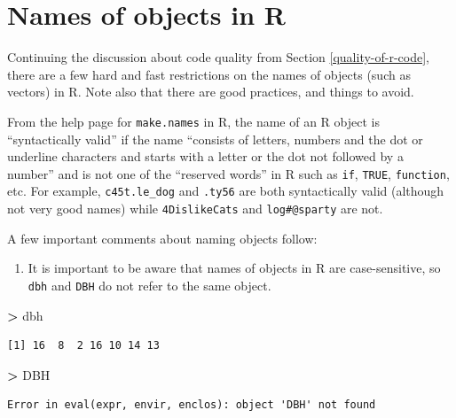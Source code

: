 \documentclass[]{krantz}
\makeatletter
\newenvironment{Shaded}{\begin{snugshade}}{\end{snugshade}}
\newcommand{\NormalTok}[1]{#1}
\newcommand{\OperatorTok}[1]{\textcolor[rgb]{0.43,0.43,0.43}{\textbf{#1}}}
\newcommand{\StringTok}[1]{\textcolor[rgb]{0.5,0.5,0.5}{#1}}
\providecommand{\tightlist}{%
  \setlength{\itemsep}{0pt}\setlength{\parskip}{0pt}}
\newenvironment{kframe}{%
\medskip{}
\setlength{\fboxsep}{.8em}
 \def\at@end@of@kframe{}%
 \ifinner\ifhmode%
  \def\at@end@of@kframe{\end{minipage}}%
  \begin{minipage}{\columnwidth}%
 \fi\fi%
 \def\FrameCommand##1{\hskip\@totalleftmargin \hskip-\fboxsep
 \colorbox{shadecolor}{##1}\hskip-\fboxsep
     \hskip-\linewidth \hskip-\@totalleftmargin \hskip\columnwidth}%
 \MakeFramed {\advance\hsize-\width
   \@totalleftmargin\z@ \linewidth\hsize
   \@setminipage}}%
 {\par\unskip\endMakeFramed%
 \at@end@of@kframe}
\renewenvironment{Shaded}{\begin{kframe}}{\end{kframe}}
\makeatother
\begin{document}
\hypertarget{names-of-objects-in-r}{%
\section{Names of objects in R}\label{names-of-objects-in-r}}

Continuing the discussion about code quality from Section \ref{quality-of-r-code}, there are a few hard and fast restrictions on the names of objects (such as vectors) in R. Note also that there are good practices, and things to avoid.

From the help page for \texttt{make.names} in R, the name of an R object is ``syntactically valid'' if the name ``consists of letters, numbers and the dot or underline characters and starts with a letter or the dot not followed by a number'' and is not one of the ``reserved words'' in R such as \texttt{if}, \texttt{TRUE}, \texttt{function}, etc. For example, \texttt{c45t.le\_dog} and \texttt{.ty56} are both syntactically valid (although not very good names) while \texttt{4DislikeCats} and \texttt{log\#@sparty} are not.

A few important comments about naming objects follow:

\begin{enumerate}
\def\labelenumi{\arabic{enumi}.}
\tightlist
\item
  It is important to be aware that names of objects in R are case-sensitive, so \texttt{dbh} and \texttt{DBH} do not refer to the same object.
\end{enumerate}

\begin{Shaded}
\begin{Highlighting}[]
\OperatorTok{>}\StringTok{ }\NormalTok{dbh}
\end{Highlighting}
\end{Shaded}

\begin{verbatim}
[1] 16  8  2 16 10 14 13
\end{verbatim}

\begin{Shaded}
\begin{Highlighting}[]
\OperatorTok{>}\StringTok{ }\NormalTok{DBH}
\end{Highlighting}
\end{Shaded}

\begin{verbatim}
Error in eval(expr, envir, enclos): object 'DBH' not found
\end{verbatim}
\end{document}
